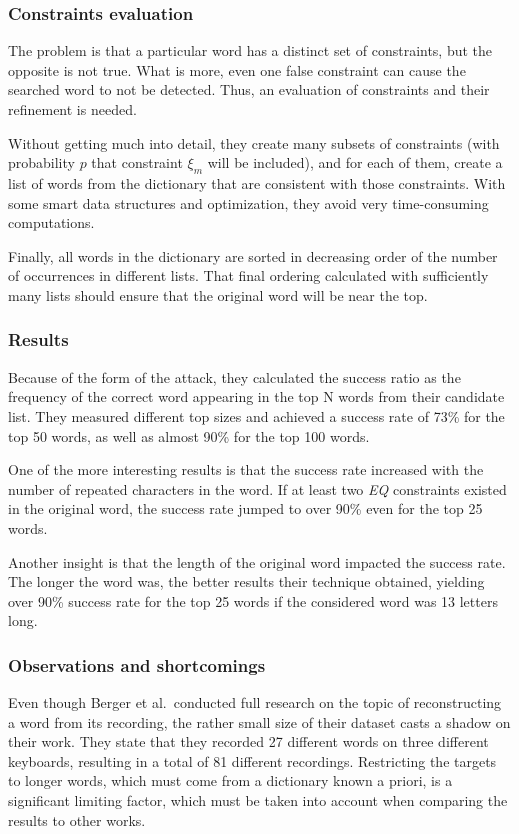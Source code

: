 \documentclass[../main.tex]{subfiles}
\begin{document}
\subsubsection{Constraints evaluation}
The problem is that a particular word has a distinct set of constraints, but the opposite is not true. What is more, even one false constraint can cause the searched word to not be detected. Thus, an evaluation of constraints and their refinement is needed.

Without getting much into detail, they create many subsets of constraints (with probability $p$ that constraint $\xi_m$ will be included), and for each of them, create a list of words from the dictionary that are consistent with those constraints. With some smart data structures and optimization, they avoid very time-consuming computations.

Finally, all words in the dictionary are sorted in decreasing order of the number of occurrences in different lists. That final ordering calculated with sufficiently many lists should ensure that the original word will be near the top.

\subsubsection{Results}
Because of the form of the attack, they calculated the success ratio as the frequency of the correct word appearing in the top N words from their candidate list. They measured different top sizes and achieved a success rate of 73\% for the top 50 words, as well as almost 90\% for the top 100 words.

One of the more interesting results is that the success rate increased with the number of repeated characters in the word. If at least two \textit{EQ} constraints existed in the original word, the success rate jumped to over 90\% even for the top 25 words.

Another insight is that the length of the original word impacted the success rate. The longer the word was, the better results their technique obtained, yielding over 90\% success rate for the top 25 words if the considered word was 13 letters long.

\subsubsection{Observations and shortcomings}
Even though Berger et al.\ conducted full research on the topic of reconstructing a word from its recording, the rather small size of their dataset casts a shadow on their work. They state that they recorded 27 different words on three different keyboards, resulting in a total of 81 different recordings.
Restricting the targets to longer words, which must come from a dictionary known a priori, is a significant limiting factor, which must be taken into account when comparing the results to other works.
\end{document}
